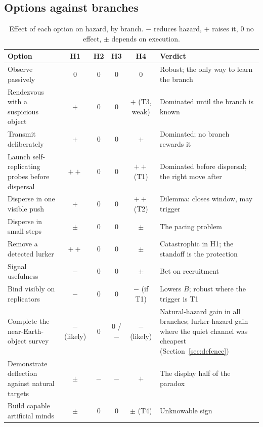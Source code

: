 \documentclass[preprint,12pt]{elsarticle}
\theoremstyle{definition}
\begin{document}
\subsection{Options against branches}

\begin{table}[!htbp]
\centering
\caption{Effect of each option on hazard, by branch. $-$ reduces hazard, $+$ raises it, $0$ no effect, $\pm$ depends on execution.}
\label{tab:decision}
\small
\begin{tabularx}{\textwidth}{@{}Xcccc>{\raggedright\arraybackslash}X@{}}
\toprule
Option & H1 & H2 & H3 & H4 & Verdict \\
\midrule
Observe passively & $0$ & $0$ & $0$ & $0$ & Robust; the only way to learn the branch \\
Rendezvous with a suspicious object & $+$ & $0$ & $0$ & $+$ (T3, weak) & Dominated until the branch is known \\
Transmit deliberately & $+$ & $0$ & $0$ & $+$ & Dominated; no branch rewards it \\
Launch self-replicating probes before dispersal & $++$ & $0$ & $0$ & $++$ (T1) & Dominated before dispersal; the right move after \\
Disperse in one visible push & $+$ & $0$ & $0$ & $++$ (T2) & Dilemma: closes window, may trigger \\
Disperse in small steps & $\pm$ & $0$ & $0$ & $\pm$ & The pacing problem \\
Remove a detected lurker & $++$ & $0$ & $0$ & $\pm$ & Catastrophic in H1; the standoff is the protection \\
Signal usefulness & $-$ & $0$ & $0$ & $\pm$ & Bet on recruitment \\
Bind visibly on replicators & $-$ & $0$ & $0$ & $-$ (if T1) & Lowers $B$; robust where the trigger is T1 \\
Complete the near-Earth-object survey & $-$ (likely) & $0$ & $0$ / $-$ & $-$ (likely) & Natural-hazard gain in all branches; lurker-hazard gain where the quiet channel was cheapest (Section~\ref{sec:defence}) \\
Demonstrate deflection against natural targets & $\pm$ & $-$ & $-$ & $+$ & The display half of the paradox \\
Build capable artificial minds & $\pm$ & $0$ & $0$ & $\pm$ (T4) & Unknowable sign \\
\bottomrule
\end{tabularx}
\end{table}
\end{document}
